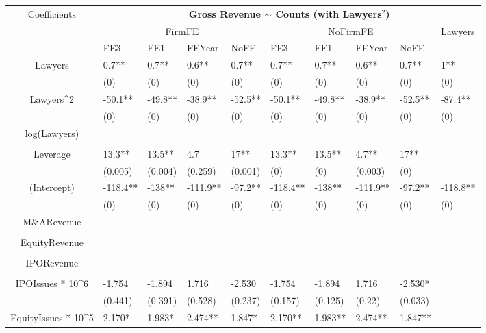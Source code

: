 \documentclass{article}
\begin{document}
\begin{table}[H]
\centering
\begin{tabular}{|clllllllll|}
\hline
\multirow{3}{*}{Coefficients} & \multicolumn{9}{c|}{\textbf{Gross Revenue $\sim$ Counts (with Lawyers$^2$)}} \\
\cline{2-10}
& \multicolumn{4}{c}{FirmFE} & \multicolumn{4}{c}{NoFirmFE} & \multirow{2}{*}{Lawyers} \\
\cline{2-9}
& FE3 & FE1 & FEYear & NoFE & FE3 & FE1 & FEYear & NoFE &  \\
\hline
 
Lawyers & 0.7** & 0.7** & 0.6** & 0.7** & 0.7** & 0.7** & 0.6** & 0.7** & 1** \\ 
   & (0) & (0) & (0) & (0) & (0) & (0) & (0) & (0) & (0) \\ 
  Lawyers^2 & -50.1** & -49.8** & -38.9** & -52.5** & -50.1** & -49.8** & -38.9** & -52.5** & -87.4** \\ 
   & (0) & (0) & (0) & (0) & (0) & (0) & (0) & (0) & (0) \\ 
  log(Lawyers) &  &  &  &  &  &  &  &  &  \\ 
   &  &  &  &  &  &  &  &  &  \\ 
  Leverage & 13.3** & 13.5** & 4.7 & 17** & 13.3** & 13.5** & 4.7** & 17** &  \\ 
   & (0.005) & (0.004) & (0.259) & (0.001) & (0) & (0) & (0.003) & (0) &  \\ 
  (Intercept) & -118.4** & -138** & -111.9** & -97.2** & -118.4** & -138** & -111.9** & -97.2** & -118.8** \\ 
   & (0) & (0) & (0) & (0) & (0) & (0) & (0) & (0) & (0) \\ 
  M\&ARevenue &  &  &  &  &  &  &  &  &  \\ 
   &  &  &  &  &  &  &  &  &  \\ 
  EquityRevenue &  &  &  &  &  &  &  &  &  \\ 
   &  &  &  &  &  &  &  &  &  \\ 
  IPORevenue &  &  &  &  &  &  &  &  &  \\ 
   &  &  &  &  &  &  &  &  &  \\ 
  IPOIssues * 10^6 & -1.754 & -1.894 & 1.716 & -2.530 & -1.754 & -1.894 & 1.716 & -2.530* &  \\ 
   & (0.441) & (0.391) & (0.528) & (0.237) & (0.157) & (0.125) & (0.22) & (0.033) &  \\ 
  EquityIssues * 10^5 & 2.170* & 1.983* & 2.474** & 1.847* & 2.170** & 1.983** & 2.474** & 1.847** &  \\ 

\end{tabular}
\end{table}
\end{document}
